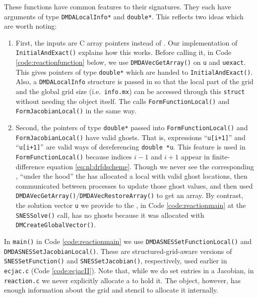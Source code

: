 
These functions have common features to their signatures.  They each have arguments of type \texttt{DMDALocalInfo*} and \texttt{double*}.  This reflects two ideas which are worth noting:
\renewcommand{\labelenumi}{(\emph{\roman{enumi}})}
\begin{enumerate}
\item First, the inputs are C array pointers instead of \pVecs.  Our implementation of \texttt{InitialAndExact()} explains how this works.  Before calling it, in Code \ref{code:reactionfunction} below, we use \texttt{DMDAVecGetArray()} on \pVecs \texttt{u} and \texttt{uexact}.  This gives pointers of type \texttt{double*} which are handed to \texttt{InitialAndExact()}.  Also, a \texttt{DMDALocalInfo} structure is passed in so that the local part of the grid and the global grid size (i.e.~\texttt{info.mx}) can be accessed through this \texttt{struct} without needing the \pDMDA object itself.  The \pSNES calls \texttt{FormFunctionLocal()} and \texttt{FormJacobianLocal()} in the same way.
\item Second, the pointers of type \texttt{double*} passed into \texttt{FormFunctionLocal()} and \texttt{FormJacobianLocal()} have valid ghosts.  That is, expressions ``\texttt{u[i+1]}'' and ``\texttt{u[i+1]}'' are valid ways of dereferencing \texttt{double *u}.  This feature is used in \texttt{FormFunctionLocal()} because indices $i-1$ and $i+1$ appear in finite-difference equation \eqref{eq:nl:drfdscheme}.  Though we never see the corresponding \pVec, ``under the hood'' the \pSNES has allocated a local \pVec with valid ghost locations, then communicated between processes to update those ghost values, and then used \texttt{DMDAVecGetArray()}/\texttt{DMDAVecRestoreArray()} to get an array.  By contrast, the solution vector \texttt{u} we provide to the \pSNES, in Code \ref{code:reactionmain} at the \texttt{SNESSolve()} call, has no ghosts because it was allocated with \texttt{DMCreateGlobalVector()}.
\end{enumerate}

In \texttt{main()} in Code \ref{code:reactionmain} we use \texttt{DMDASNESSetFunctionLocal()} and  \texttt{DMDASNESSetJacobianLocal()}.  These are structured-grid-aware versions of \texttt{SNESSetFunction()} and \texttt{SNESSetJacobian()}, respectively, used earlier in \texttt{ecjac.c} (Code \ref{code:ecjacII}).  Note that, while we do set entries in a Jacobian, in \texttt{reaction.c} we never explicitly allocate a \pMat to hold it.  The \pDMDA object, however, has enough information about the grid and stencil to allocate it internally.

